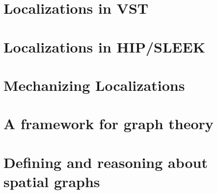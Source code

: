 \documentclass[sigplan,10pt,anonymous]{acmart}\settopmatter{printfolios=true,printccs=false,printacmref=false}
\begin{document}


\section{Localizations in VST}
\label{sec:orientation}



\section{Localizations in HIP/SLEEK}
\label{sec:hipsleek} %
\label{sec:hipsleekmark}



\section{Mechanizing Localizations}
\label{sec:localizations}


\section{A framework for graph theory}
\label{sec:mathgraph}



\section{Defining and reasoning about spatial graphs}
\label{sec:spacegraph}





%

\end{document}
